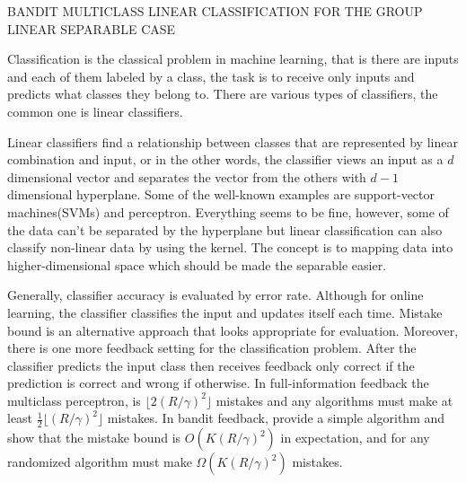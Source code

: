 \justify
\centering
{\fontsize{14pt}{1.5}\selectfont BANDIT MULTICLASS LINEAR CLASSIFICATION FOR THE GROUP LINEAR SEPARABLE CASE}
\justify



Classification is the classical problem in machine learning,
that is there are inputs and each of them labeled by a class,
the task is to receive only inputs and predicts what classes they belong to.
There are various types of classifiers, the common one is linear classifiers.

Linear classifiers find a relationship between classes that are represented by linear combination and input,
or in the other words, the classifier views an input as a $d$ dimensional vector and separates the vector from the others with $d-1$ dimensional hyperplane.
Some of the well-known examples are support-vector machines(SVMs) and perceptron.
Everything seems to be fine, however, some of the data can't be separated by the hyperplane
but linear classification can also classify non-linear data by using the kernel.
The concept is to mapping data into higher-dimensional space which should be made 
the separable easier.

Generally, classifier accuracy is evaluated by error rate. Although for online learning, the classifier classifies the input and updates itself each time.
Mistake bound is an alternative approach that looks appropriate for evaluation.
Moreover, there is one more feedback setting for the classification problem. 
After the classifier predicts the input class then receives feedback only correct if the prediction is correct and wrong if otherwise.
In full-information feedback the multiclass perceptron, \cite{CrammerS2003-ultraconservative} is $\lfloor 2(R/\gamma)^2\rfloor$ mistakes
and any algorithms must make at least $\frac{1}{2}\lfloor (R/\gamma)^2\rfloor$ mistakes.
In bandit feedback, \cite{BeygelzimerPSTWZ2019-separable} provide a simple algorithm and show that the mistake bound
is $O(K(R/\gamma)^2)$ in expectation, and for any randomized algorithm must make $\Omega (K(R/\gamma)^2)$ mistakes.

